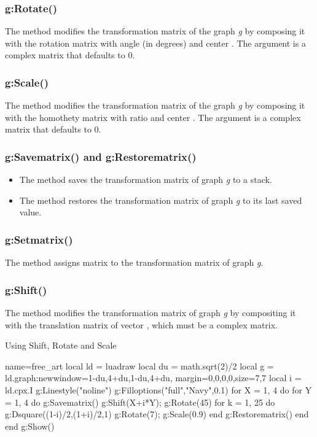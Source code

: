 \subsubsection{g:Rotate()}
The  method modifies the transformation matrix of the graph \emph g by composing it with the rotation matrix with angle  (in degrees) and center . The argument  is a complex matrix that defaults to $0$.

\subsubsection{g:Scale()}
The  method modifies the transformation matrix of the graph \emph g by composing it with the homothety matrix with ratio  and center . The argument  is a complex matrix that defaults to $0$.

\subsubsection{g:Savematrix() and g:Restorematrix()}
\begin{itemize}
    \item The  method saves the transformation matrix of graph \emph g to a stack.
    \item The  method restores the transformation matrix of graph \emph g to its last saved value.
\end{itemize}

\subsubsection{g:Setmatrix()}
The  method assigns matrix  to the transformation matrix of graph \emph g.

\subsubsection{g:Shift()}
The  method modifies the transformation matrix of graph \emph g by compositing it with the translation matrix of vector , which must be a complex matrix.

\begin{demo}{Using Shift, Rotate and Scale}
\begin{luadraw}{name=free_art}
local ld = luadraw
local du = math.sqrt(2)/2
local g = ld.graph:new{window={1-du,4+du,1-du,4+du},
    margin={0,0,0,0},size={7,7}}
local i = ld.cpx.I
g:Linestyle("noline")
g:Filloptions("full","Navy",0.1)
for X = 1, 4 do
    for Y = 1, 4 do
        g:Savematrix()
        g:Shift(X+i*Y); g:Rotate(45)
        for k = 1, 25 do
            g:Dsquare((1-i)/2,(1+i)/2,1)
            g:Rotate(7); g:Scale(0.9)
        end
        g:Restorematrix()
    end
end
g:Show()
\end{luadraw}
\end{demo}

